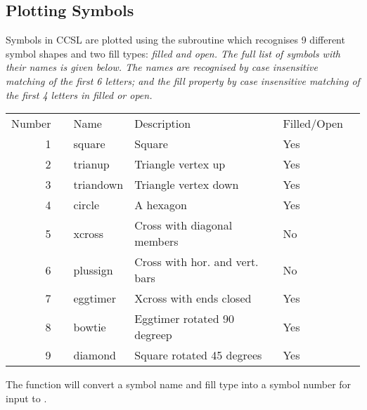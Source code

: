 \subsection{Plotting Symbols}
Symbols in CCSL are plotted using the subroutine  which recognises 9 different symbol shapes and two fill types: \em{filled} and \em{open}. The full list of symbols
with their names is given below. The names are recognised by case insensitive matching 
of the first 6 letters; and the fill property by case insensitive matching
of the first 4 letters in \em{filled} or \em{open}. \\[1ex]
\begin{tabular}{rlllll}
\hspace{10mm}Number&\quad&Name&Description&Filled/Open\\
1&&square&Square&Yes\\
2&&trianup&Triangle vertex up&Yes\\
3&&triandown&Triangle vertex down&Yes\\
4&&circle&A hexagon&Yes\\
5&&xcross&Cross with diagonal members&No\\
6&&plussign&Cross with hor. and vert. bars&No\\
7&&eggtimer&Xcross with ends closed&Yes\\
8&&bowtie&Eggtimer rotated 90 degreep&Yes\\
9&&diamond&Square rotated 45 degrees&Yes\\
\end{tabular}
The function  will convert a symbol name and fill type into a symbol
number for input to .

\finchapter
%
